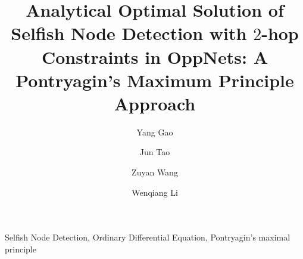 \documentclass[conference]{IEEEtran}
\begin{document}
\title{Analytical Optimal Solution of Selfish Node Detection with $2$-hop Constraints in OppNets: A Pontryagin's Maximum Principle Approach
}
\author[1,2,3]{Yang Gao}
\author[1,2,3]{Jun Tao}
\author[1,2]{Zuyan Wang}
\author[1,3]{Wenqiang Li}



\maketitle



\begin{IEEEkeywords}
Selfish Node Detection, Ordinary Differential Equation,
Pontryagin's maximal principle
\end{IEEEkeywords}











\end{document}
